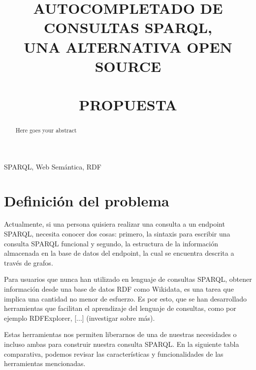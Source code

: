\documentclass[conference,compsoc]{IEEEtran}
\begin{document}
\title{AUTOCOMPLETADO DE CONSULTAS SPARQL,\\UNA ALTERNATIVA OPEN SOURCE\\ \ \\PROPUESTA}

\author{
}

\maketitle

\IEEEpubidadjcol

\begin{abstract}
    Here goes your abstract
\end{abstract}

\begin{IEEEkeywords}
    SPARQL, Web Semántica, RDF
\end{IEEEkeywords}

\IEEEpeerreviewmaketitle

\section{Definición del problema}

Actualmente, si una persona quisiera realizar una consulta a un endpoint SPARQL,
necesita conocer dos cosas: primero, la sintaxis para escribir una consulta
SPARQL funcional y segundo, la estructura de la información almacenada en la base
de datos del endpoint, la cual se encuentra descrita a través de grafos.

Para usuarios que nunca han utilizado en lenguaje de consultas SPARQL, obtener
información desde una base de datos RDF como Wikidata, es una tarea que implica
una cantidad no menor de esfuerzo. Es por esto, que se han desarrollado herramientas
que facilitan el aprendizaje del lenguaje de consultas, como por ejemplo
RDFExplorer, [...] (investigar sobre más).

Estas herramientas nos permiten liberarnos de una de nuestras necesidades o incluso
ambas para construir nuestra consulta SPARQL. En la siguiente tabla comparativa,
podemos revisar las características y funcionalidades de las herramientas mencionadas.
\end{document}
